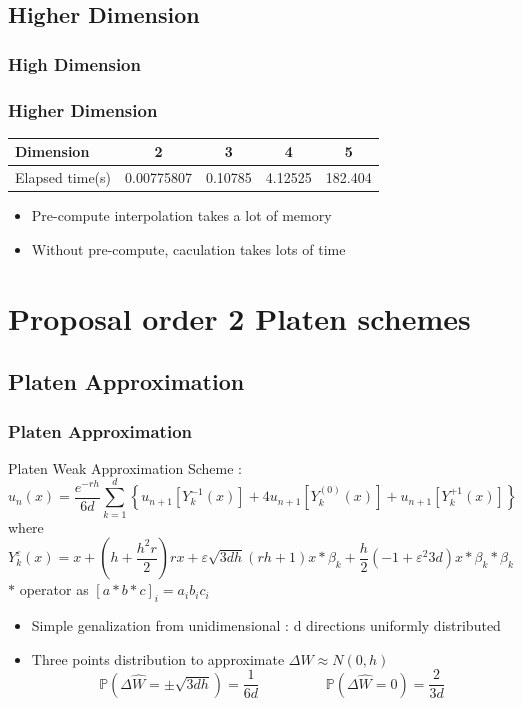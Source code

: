 \documentclass[]{beamer}
\begin{document}
\subsection{Higher Dimension}
\frametitle{High Dimension}
\begin{frame}
\frametitle{Higher Dimension}
\begin{center}
\begin{tabular}{l|c|c|c|c}
Dimension   &  2          & 3       & 4       & 5  \\
\hline\hline
Elapsed time(s)  &  0.00775807 & 0.10785 & 4.12525 & 182.404 \\
\end{tabular}
\end{center}
\begin{itemize}
 \item Pre-compute interpolation takes a lot of memory 
 \item Without pre-compute, caculation takes lots of time
\end{itemize}

\end{frame}
\section{Proposal order 2 Platen schemes}
\subsection{Platen Approximation}
\begin{frame}
\frametitle{Platen Approximation}
Platen Weak Approximation Scheme : 
\begin{equation*}
u_n(x) = \frac{e^{-rh}}{6d}\sum^d_{k=1} \left\lbrace u_{n+1}[Y^{-1}_k(x)] +  4u_{n+1}[Y^{(0)}_k(x)]+ u_{n+1}[Y^{+1}_k(x)] \right\rbrace
\end{equation*}
where 
\begin{equation*}
Y^{\varepsilon}_{k}(x) = x 
                     + (h + \frac{h^2r}{2}  ) rx
                     + \varepsilon \sqrt{3dh}(rh + 1 )  x*\beta_k
                     + \frac{h}{2}(-1 + \varepsilon^2 3d)x*\beta_k*\beta_k       
\end{equation*}
$*$ operator as $[a*b*c]_i = a_ib_ic_i$
\begin{itemize}
 \item Simple genalization from unidimensional : d directions uniformly distributed
 \item Three points distribution to approximate $\Delta W \approx N(0,h) $
 \[\mathbb{P}(\Delta\hat{W}=\pm \sqrt{3dh})=\frac{1}{6d} \hspace{2cm} \mathbb{P}(\Delta\hat{W}=0)=\frac{2}{3d} \]
\end{itemize}
\end{frame}
\end{document}
